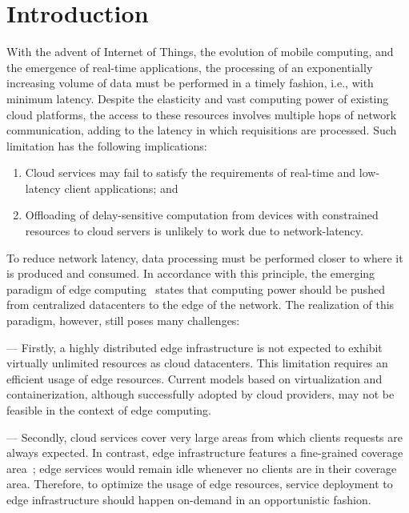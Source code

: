 \section{Introduction}

With the advent of Internet of Things, the evolution of mobile computing, and the emergence of real-time applications, the processing of an exponentially increasing volume of data must be performed in a timely fashion, i.e., with minimum latency. Despite the elasticity and vast computing power of existing cloud platforms, the access to these resources involves multiple hops of network communication, adding to the latency in which requisitions are processed. Such limitation has the following implications:

\begin{enumerate}

\item Cloud services may fail to satisfy the requirements of real-time and low-latency client applications; and

\item Offloading of delay-sensitive computation from devices with constrained resources to cloud servers is unlikely to work due to network-latency.

\end{enumerate}

To reduce network latency, data processing must be performed closer to where it is produced and consumed. In accordance with this principle, the emerging paradigm of edge computing~\cite{} states that computing power should be pushed from centralized datacenters to the edge of the network. The realization of this paradigm, however, still poses many challenges:

%
--- Firstly, a highly distributed edge infrastructure is not expected to exhibit virtually unlimited resources as cloud datacenters. This limitation requires an efficient usage of edge resources. Current models based on virtualization and containerization, although successfully adopted by cloud providers, may not be feasible in the context of edge computing.

--- Secondly, cloud services cover very large areas from which clients requests are always expected. In contrast, edge infrastructure features a fine-grained coverage area~\cite{5Gchallenges}; edge services would remain idle whenever no clients are in their coverage area. Therefore, to optimize the usage of edge resources, service deployment to edge infrastructure should happen on-demand in an opportunistic fashion. 

